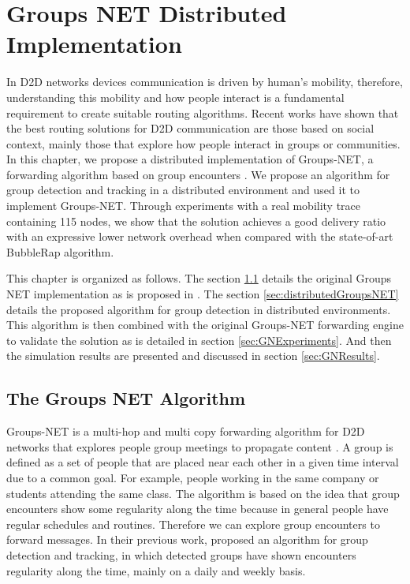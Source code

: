 \chapter{Groups NET Distributed Implementation}
\label{ch:GroupsNet}

In D2D networks devices communication is driven by human's mobility, therefore, understanding this mobility and how people interact is a fundamental requirement to create suitable routing algorithms. Recent works have shown that the best routing solutions for D2D communication are those based on social context, mainly those that explore how people interact in groups or communities. In this chapter, we propose a distributed implementation of Groups-NET, a forwarding algorithm based on group encounters \citep{nunes2016leveraging}. We propose an algorithm for group detection and tracking in a distributed environment and used it to implement Groups-NET. Through experiments with a real mobility trace containing 115 nodes, we show that the solution achieves a good delivery ratio with an expressive lower network overhead when compared with the state-of-art BubbleRap algorithm.

This chapter is organized as follows. The section \ref{sec:groupsNet} details the original Groups NET implementation as is proposed in \cite{nunes2016leveraging}. The section \ref{sec:distributedGroupsNET} details the proposed algorithm for group detection in distributed environments. This algorithm is then combined with the original Groups-NET forwarding engine to validate the solution as is detailed in section \ref{sec:GNExperiments}. And then the simulation results are presented and discussed in section \ref{sec:GNResults}.

\section{The Groups NET Algorithm}
\label{sec:groupsNet}

Groups-NET is a multi-hop and multi copy forwarding algorithm for D2D networks that explores people group meetings to propagate content \citep{nunes2016leveraging}. A group is defined as a set of people that are placed near each other in a given time interval due to a common goal. For example, people working in the same company or students attending the same class. The algorithm is based on the idea that group encounters show some regularity along the time because in general people have regular schedules and routines. Therefore we can explore group encounters to forward messages. In their previous work, \citet{groupMobility} proposed an algorithm for group detection and tracking, in which detected groups have shown encounters regularity along the time, mainly on a daily and weekly basis.

